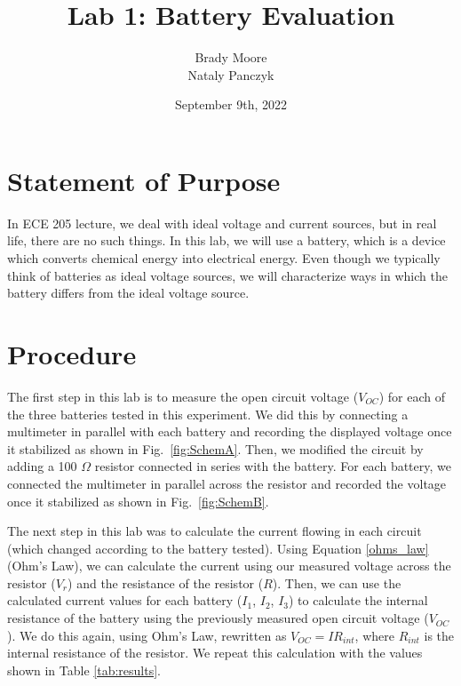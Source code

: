 \documentclass{report}
\title{Lab 1: Battery Evaluation}
\date{September 9th, 2022}
\author{Brady Moore \\
    Nataly Panczyk}
\begin{document}
\maketitle
\section{Statement of Purpose}
In ECE 205 lecture, we deal with ideal voltage and current sources, but in real life, there are no such things.
In this lab, we will use a battery, which is a device which converts chemical energy into electrical energy.
Even though we typically think of batteries as ideal voltage sources, we will characterize ways in which the battery differs from the ideal voltage source.

\section{Procedure}
The first step in this lab is to measure the open circuit voltage ($V_{OC}$) for each of the three batteries tested in this experiment.
We did this by connecting a multimeter in parallel with each battery and recording the displayed voltage once it stabilized as shown in Fig.~\ref{fig:SchemA}. Then, we modified
the circuit by adding a 100 $\Omega$ resistor connected in series with the battery. For each battery, we connected the multimeter in parallel
across the resistor and recorded the voltage once it stabilized as shown in Fig.~\ref{fig:SchemB}.


The next step in this lab was to calculate the current flowing in each circuit (which changed according to the battery tested). Using Equation \ref{ohms_law}
(Ohm's Law), we can calculate the current using our measured voltage across the resistor ($V_r$) and the resistance of the resistor ($R$).
Then, we can use the calculated current values for each battery ($I_1$, $I_2$, $I_3$) to calculate the internal resistance of the battery using
the previously measured open circuit voltage ($V_{OC}$). We do this again, using Ohm's Law, rewritten as $V_{OC} = IR_{int}$, where $R_{int}$
is the internal resistance of the resistor. We repeat this calculation with the values shown in Table \ref{tab:results}.
\end{document}
